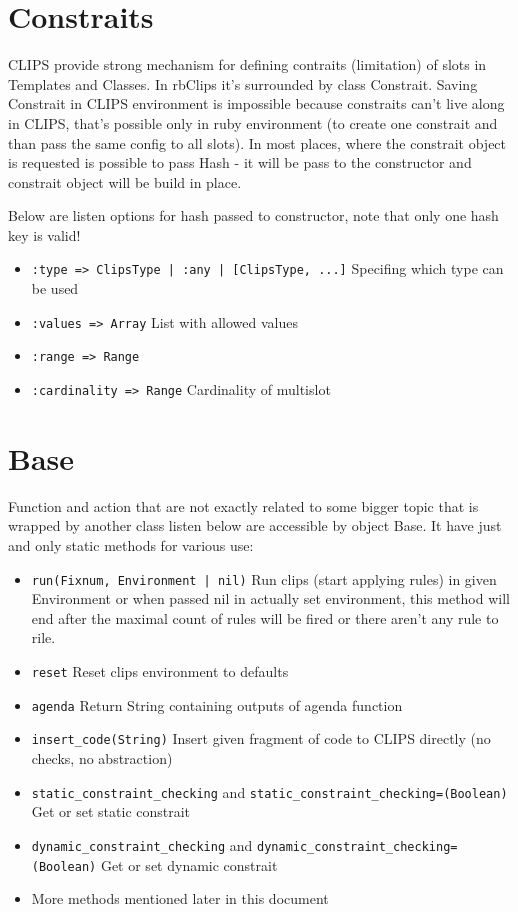 \documentclass[a4paper,10pt]{article}
\begin{document}
\section{Constraits}
CLIPS provide strong mechanism for defining contraits (limitation) of slots in Templates and Classes. In rbClips it's surrounded by class Constrait. Saving Constrait in CLIPS environment is impossible because constraits can't live along in CLIPS, that's possible only in ruby environment (to create one constrait and than pass the same config to all slots). In most places, where the constrait object is requested is possible to pass Hash - it will be pass to the constructor and constrait object will be build in place.

Below are listen options for hash passed to constructor, note that only one hash key is valid!
\begin{itemize}
 \item \texttt{:type => ClipsType | :any | [ClipsType, ...]} Specifing which type can be used
 \item \texttt{:values => Array} List with allowed values
 \item \texttt{:range => Range}
 \item \texttt{:cardinality => Range} Cardinality of multislot
\end{itemize}

\section{Base}
Function and action that are not exactly related to some bigger topic that is wrapped by another class listen below are accessible by object Base. It have just and only static methods for various use:
\begin{itemize}
 \item \texttt{run(Fixnum, Environment | nil)} Run clips (start applying rules) in given Environment or when passed nil in actually set environment, this method will end after the maximal count of rules will be fired or there aren't any rule to rile.
 \item \texttt{reset} Reset clips environment to defaults
 \item \texttt{agenda} Return String containing outputs of agenda function
 \item \texttt{insert\_code(String)} Insert given fragment of code to CLIPS directly (no checks, no abstraction)
 \item \texttt{static\_constraint\_checking} and \texttt{static\_constraint\_checking=(Boolean)} Get or set static constrait
 \item \texttt{dynamic\_constraint\_checking} and \texttt{dynamic\_constraint\_checking=(Boolean)} Get or set dynamic constrait
 \item More methods mentioned later in this document
\end{itemize}
\end{document}

